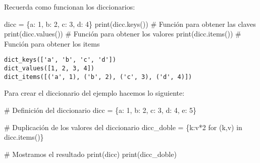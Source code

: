 \documentclass[
  letterpaper,
  DIV=11,
  numbers=noendperiod]{scrreprt}
\newenvironment{Shaded}{\begin{snugshade}}{\end{snugshade}}
\newcommand{\BuiltInTok}[1]{\textcolor[rgb]{0.00,0.23,0.31}{#1}}
\newcommand{\CommentTok}[1]{\textcolor[rgb]{0.37,0.37,0.37}{#1}}
\newcommand{\ControlFlowTok}[1]{\textcolor[rgb]{0.00,0.23,0.31}{#1}}
\newcommand{\DecValTok}[1]{\textcolor[rgb]{0.68,0.00,0.00}{#1}}
\newcommand{\KeywordTok}[1]{\textcolor[rgb]{0.00,0.23,0.31}{#1}}
\newcommand{\NormalTok}[1]{\textcolor[rgb]{0.00,0.23,0.31}{#1}}
\newcommand{\OperatorTok}[1]{\textcolor[rgb]{0.37,0.37,0.37}{#1}}
\newcommand{\StringTok}[1]{\textcolor[rgb]{0.13,0.47,0.30}{#1}}
\begin{document}
Recuerda como funcionan los diccionarios:

\begin{Shaded}
\begin{Highlighting}[]
\NormalTok{dicc }\OperatorTok{=}\NormalTok{ \{}\StringTok{\textquotesingle{}a\textquotesingle{}}\NormalTok{: }\DecValTok{1}\NormalTok{, }\StringTok{\textquotesingle{}b\textquotesingle{}}\NormalTok{: }\DecValTok{2}\NormalTok{, }\StringTok{\textquotesingle{}c\textquotesingle{}}\NormalTok{: }\DecValTok{3}\NormalTok{, }\StringTok{\textquotesingle{}d\textquotesingle{}}\NormalTok{: }\DecValTok{4}\NormalTok{\}}
\BuiltInTok{print}\NormalTok{(dicc.keys())   }\CommentTok{\# Función para obtener las claves}
\BuiltInTok{print}\NormalTok{(dicc.values()) }\CommentTok{\# Función para obtener los valores}
\BuiltInTok{print}\NormalTok{(dicc.items())  }\CommentTok{\# Función para obtener los items}
\end{Highlighting}
\end{Shaded}

\begin{verbatim}
dict_keys(['a', 'b', 'c', 'd'])
dict_values([1, 2, 3, 4])
dict_items([('a', 1), ('b', 2), ('c', 3), ('d', 4)])
\end{verbatim}

Para crear el diccionario del ejemplo hacemos lo siguiente:

\begin{Shaded}
\begin{Highlighting}[]
\CommentTok{\# Definición del diccionario}
\NormalTok{dicc }\OperatorTok{=}\NormalTok{ \{}\StringTok{\textquotesingle{}a\textquotesingle{}}\NormalTok{: }\DecValTok{1}\NormalTok{, }\StringTok{\textquotesingle{}b\textquotesingle{}}\NormalTok{: }\DecValTok{2}\NormalTok{, }\StringTok{\textquotesingle{}c\textquotesingle{}}\NormalTok{: }\DecValTok{3}\NormalTok{, }\StringTok{\textquotesingle{}d\textquotesingle{}}\NormalTok{: }\DecValTok{4}\NormalTok{, }\StringTok{\textquotesingle{}e\textquotesingle{}}\NormalTok{: }\DecValTok{5}\NormalTok{\}}

\CommentTok{\# Duplicación de los valores del diccionario}
\NormalTok{dicc\_doble }\OperatorTok{=}\NormalTok{ \{k:v}\OperatorTok{*}\DecValTok{2} \ControlFlowTok{for}\NormalTok{ (k,v) }\KeywordTok{in}\NormalTok{ dicc.items()\}}

\CommentTok{\# Mostramos el resultado}
\BuiltInTok{print}\NormalTok{(dicc)}
\BuiltInTok{print}\NormalTok{(dicc\_doble)}
\end{Highlighting}
\end{Shaded}
\end{document}
